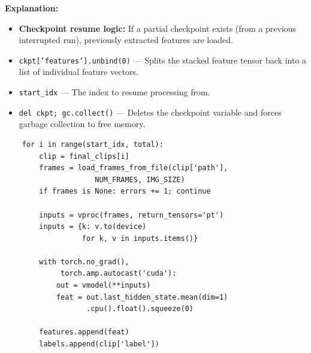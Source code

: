 \documentclass[a4paper, 12pt]{article}
\newenvironment{explanation}{%
  \par\smallskip
  \noindent\textcolor{blue!70!black}{\textbf{Explanation:}}\\
  \noindent
}{\par\medskip}
\begin{document}
\begin{explanation}
\begin{itemize}[nosep]
  \item \textbf{Checkpoint resume logic:} If a partial checkpoint exists (from a previous interrupted run), previously extracted features are loaded.
  \item \texttt{ckpt['features'].unbind(0)} --- Splits the stacked feature tensor back into a list of individual feature vectors.
  \item \texttt{start\_idx} --- The index to resume processing from.
  \item \texttt{del ckpt; gc.collect()} --- Deletes the checkpoint variable and forces garbage collection to free memory.
\end{itemize}
\end{explanation}

\begin{lstlisting}
    for i in range(start_idx, total):
        clip = final_clips[i]
        frames = load_frames_from_file(clip['path'],
                     NUM_FRAMES, IMG_SIZE)
        if frames is None: errors += 1; continue

        inputs = vproc(frames, return_tensors='pt')
        inputs = {k: v.to(device)
                  for k, v in inputs.items()}

        with torch.no_grad(),
             torch.amp.autocast('cuda'):
            out = vmodel(**inputs)
            feat = out.last_hidden_state.mean(dim=1)
                   .cpu().float().squeeze(0)

        features.append(feat)
        labels.append(clip['label'])
\end{lstlisting}
\end{document}
